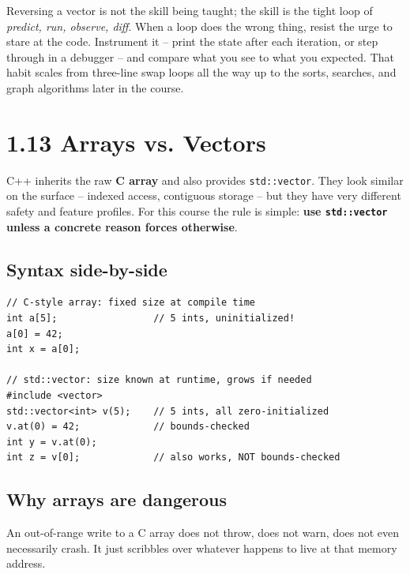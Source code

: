 \documentclass[11pt]{article}
\begin{document}
\begin{ideabox}
Reversing a vector is not the skill being taught; the skill is the
tight loop of \emph{predict, run, observe, diff}. When a loop does the
wrong thing, resist the urge to stare at the code. Instrument it --
print the state after each iteration, or step through in a debugger --
and compare what you see to what you expected. That habit scales from
three-line swap loops all the way up to the sorts, searches, and graph
algorithms later in the course.
\end{ideabox}

\section{1.13 Arrays vs. Vectors}

C++ inherits the raw \textbf{C array} and also provides
\texttt{std::vector}. They look similar on the surface -- indexed access,
contiguous storage -- but they have very different safety and feature
profiles. For this course the rule is simple: \textbf{use
\texttt{std::vector} unless a concrete reason forces otherwise}.

\subsection{Syntax side-by-side}

\begin{examplebox}
\begin{verbatim}
// C-style array: fixed size at compile time
int a[5];                 // 5 ints, uninitialized!
a[0] = 42;
int x = a[0];

// std::vector: size known at runtime, grows if needed
#include <vector>
std::vector<int> v(5);    // 5 ints, all zero-initialized
v.at(0) = 42;             // bounds-checked
int y = v.at(0);
int z = v[0];             // also works, NOT bounds-checked
\end{verbatim}
\end{examplebox}

\subsection{Why arrays are dangerous}

An out-of-range write to a C array does not throw, does not warn, does
not even necessarily crash. It just scribbles over whatever happens to
live at that memory address.
\end{document}
